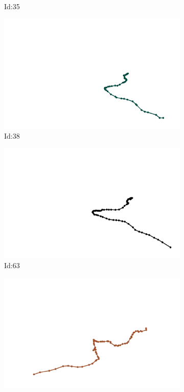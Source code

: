 \documentclass[12pt,twoside]{report}
\begin{document}
\begin{figure}
\begin{subfigure}[b]{0.20\textwidth}
\caption{Id:35}
\end{subfigure}
\begin{subfigure}[b]{0.20\textwidth}
\centering
\includegraphics[width=\textwidth]{../trajectories/38.png}
\caption{Id:38}
\end{subfigure}
\begin{subfigure}[b]{0.20\textwidth}
\centering
\includegraphics[width=\textwidth]{../trajectories/63.png}
\caption{Id:63}
\end{subfigure}
\begin{subfigure}[b]{0.20\textwidth}
\centering
\includegraphics[width=\textwidth]{../trajectories/79.png}

\end{subfigure}
\end{figure}
\end{document}
